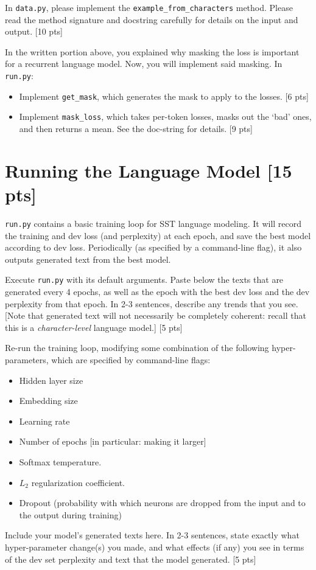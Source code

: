 \documentclass[11pt]{article}
\begin{document}
\noindent In \texttt{data.py}, please implement the \texttt{example\_from\_characters} method.  Please read the method signature and docstring carefully for details on the input and output. \hfill [10 pts]


\vspace{2em}
 In the written portion above, you explained why masking the loss is important for a recurrent language model.  Now, you will implement said masking.  In \texttt{run.py}:
\begin{itemize}
  \item Implement \texttt{get\_mask}, which generates the mask to apply to the losses. \hfill [6 pts]
  \item Implement \texttt{mask\_loss}, which takes per-token losses, masks out the `bad' ones, and then returns a mean.  See the doc-string for details. \hfill [9 pts]
\end{itemize}


\section{Running the Language Model [15 pts]}

\texttt{run.py} contains a basic training loop for SST language modeling. It will record the training and dev loss (and perplexity) at each epoch, and save the best model according to dev loss.  Periodically (as specified by a command-line flag), it also outputs generated text from the best model.

\vspace{2em}
 Execute \texttt{run.py} with its default arguments.  Paste below the texts that are generated every 4 epochs, as well as the epoch with the best dev loss and the dev perplexity from that epoch.  In 2-3 sentences, describe any trends that you see.  [Note that generated text will not necessarily be completely coherent: recall that this is a \emph{character-level} language model.] \hfill [5 pts]

\vspace{2em}
 Re-run the training loop, modifying some combination of the following hyper-parameters, which are specified by command-line flags:
\begin{itemize}
  \item Hidden layer size
  \item Embedding size
  \item Learning rate
  \item Number of epochs [in particular: making it larger]
  \item Softmax temperature. 
  \item $L_2$ regularization coefficient.
  \item Dropout (probability with which neurons are dropped from the input and to the output during training)
\end{itemize}
Include your model's generated texts here.  In 2-3 sentences, state exactly what hyper-parameter change(s) you made, and what effects (if any) you see in terms of the dev set perplexity and text that the model generated. \hfill [5 pts]
\end{document}
